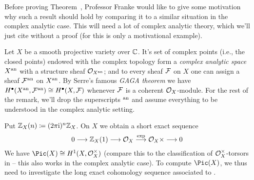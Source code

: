 \documentclass[a4paper,parskip=half,numbers=enddot, DIV=12]{scrreprt}
\begin{document}
\begin{rem}
	Before proving Theorem~, Professor Franke would like to give some motivation why such a result should hold by comparing it to a similar situation in the complex analytic case. This will need a lot of complex analytic theory, which we'll just cite without a proof (for this is only a motivational example).
	
	Let $X$ be a smooth projective variety over $\mathbb{C}$. It's set of complex points (i.e., the closed points) endowed with the complex topology form a \emph{complex analytic space} $X^{\mathrm{an}}$ with a structure sheaf $\mathcal{O}_{X^{\mathrm{an}}}$; and to every sheaf $\mathcal{F}$ on $X$ one can assign a sheaf $\mathcal{F}^{\mathrm{an}}$ on $X^{\mathrm{an}}$. By Serre's famous \emph{GAGA theorem} we have $H^\bullet(X^{\mathrm{an}},\mathcal{F}^{\mathrm{an}})\cong H^\bullet(X,\mathcal{F})$ whenever $\mathcal{F}$ is a coherent $\mathcal{O}_X$-module. For the rest of the remark, we'll drop the superscripts $^{\mathrm{an}}$ and assume everything to be understood in the complex analytic setting.
	
	Put $\mathbb{Z}_X(n)\coloneqq (2\pi\mathrm{i})^n\mathbb{Z}_X$. On $X$ we obtain a short exact sequence
	\begin{align}\lbl{eq:ComplexSeq}
		0\morphism \IZ_X(1)\morphism\Oo_X\morphism[\exp]\Oo_X\times\morphism 0
	\end{align}
	We have $\Pic(X)\cong H^1(X,\Oo_X^\times)$ (compare this to the classification of $\mathcal{O}_X^\times$-torsors in \cite[Section~1.7]{alggeo2} -- this also works in the complex analytic case). To compute $\Pic(X)$, we thus need to investigate the long exact cohomology sequence associated to .
	

\end{rem}
\end{document}
